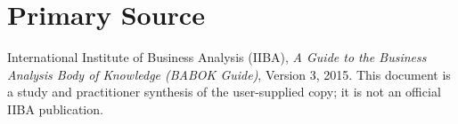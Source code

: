 \documentclass[11pt]{article}
\begin{document}
\section*{Primary Source}
International Institute of Business Analysis (IIBA), \emph{A Guide to the Business Analysis Body of Knowledge (BABOK Guide)}, Version 3, 2015. This document is a study and practitioner synthesis of the user-supplied copy; it is not an official IIBA publication.
\end{document}
